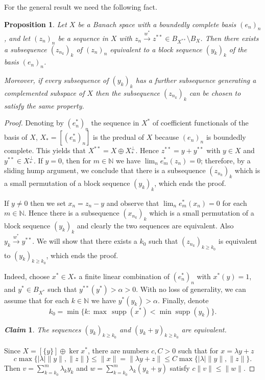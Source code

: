 \documentclass[12pt]{amsart}
\theoremstyle{plain}
\numberwithin{equation}{section}
\newcommand{\N}{\mathbb{N}}
\DeclareMathOperator{\supp}{supp}
\newtheorem{proposition}[theorem]{Proposition}
\newtheorem*{claim}{\textit{Claim}}
\begin{document}
For the general result we need the following fact.

\begin{proposition}\label{P7}
Let $X$ be a Banach space with a boundedly complete basis $(e_n)_n$, and let $(z_n)_n$ be a sequence in $X$ with $z_n \xrightarrow{w^*} z^{**} \in B_{X^{**}}\setminus B_X$. Then there exists a subsequence $(z_{n_k})_k$ of $(z_n)_n$ equivalent to a block sequence $(y_k)_k$ of the basis $(e_n)_n$.

Moreover, if every subsequence of $(y_k)_{k}$ has a further subsequence generating a complemented subspace of $X$ then the subsequence $(z_{n_k})_k$ can be chosen to satisfy the same property.
\end{proposition}
\begin{proof}
Denoting by $(e_n^*)_n$ the sequence in $X^*$ of coefficient functionals of the basis of $X$, $X_* = [(e_n^*)_n]$ is the predual of $X$ because $(e_n)_n$ is boundedly complete.
This yields that $X^{**} = X\oplus X_*^\perp$. Hence $z^{**} = y + y^{**}$ with $y\in X$ and $y^{**} \in X_*^\perp$. If $y=0$, then for $m\in \N$ we have $\lim_n e_m^*(z_n) = 0$; therefore, by a sliding hump argument, we conclude that there is a subsequence $(z_{n_k})_k$ which is a small permutation of a block sequence $(y_k)_k$, which ends the proof.

If $y \neq 0$ then we set $x_n= z_n-y$ and observe that $\lim_n e_m^*(x_n) = 0$ for each $m\in \N$. Hence there is a subsequence $(x_{n_k})_k$ which is a small permutation of a block sequence $(y_k)_k$ and clearly the two sequences are equivalent. Also $y_k \xrightarrow{w^*} y^{**}$. We will show that there exists a $k_0$ such that $(z_{n_k})_{k\geq k_0}$ is equivalent to $(y_k)_{k \geq k_0}$, which ends the proof.

Indeed, choose $x^* \in X_*$ a finite linear combination of $(e_n^*)_n$ with $x^*(y) = 1$, and  $y^*\in B_{X^*}$ such that $y^{**}(y^*) > \alpha >0$. With no loss of generality, we can assume that for each $k\in \N$ we have $y^*(y_k) > \alpha$. Finally, denote
\[ k_0 = \min \big\{ k: \max\, \supp(x^*) < \min \supp(y_k) \big\}. \]
\begin{claim}
The sequences $(y_k)_{k\geq k_0}$ and $(y_k + y)_{k\geq k_0}$ are equivalent.
\end{claim}
Since $X= [\{y\}] \oplus \ker x^*$, there are numbers $c, C > 0$ such that for $x= \lambda y + z$
\[ c \max\{ |\lambda| \|y\|, \|z\| \} \leq \|x\| = \| \lambda y + z \| \leq C \max\{ |\lambda| \|y\|, \|z\| \}. \]
Then $v= \sum_{k=k_0}^m\lambda_k y_k$ and $w =\sum_{k=k_0}^m \lambda_k (y_k + y)$ satisfy $c \|v\| \leq \|w\|$.


\end{proof}
\end{document}
